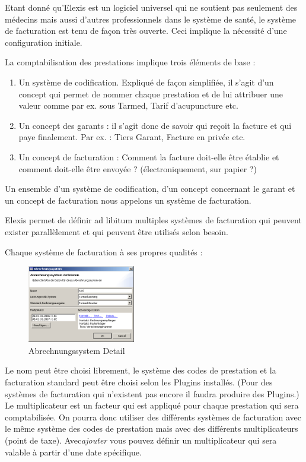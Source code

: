 Etant donné qu'Elexis est un logiciel universel qui ne soutient pas seulement des médecins mais aussi d'autres professionnels dans le système de santé, le système de facturation est tenu de façon très ouverte. Ceci implique la nécessité d'une configuration initiale.

La comptabilisation des prestations implique trois éléments de base :
\begin{enumerate}
    \item Un système de codification. Expliqué de façon simplifiée, il s'agit d'un concept qui permet de nommer chaque prestation et de lui attribuer une valeur comme par ex. sous \glqq Tarmed\grqq{}, \glqq Tarif d'acupuncture \grqq{} etc.
   \item Un concept des garants : il s'agit donc de savoir qui reçoit la facture et qui paye finalement.  Par ex. : Tiers Garant, Facture en privée etc.
   \item Un concept de facturation : Comment la facture doit-elle être établie et comment doit-elle être envoyée ? (électroniquement, sur papier ?)
\end{enumerate}

Un ensemble d'un système de codification, d'un concept concernant le garant et un concept de facturation nous appelons un  \glqq système de facturation\grqq{}.

Elexis permet de définir ad libitum multiples systèmes de facturation qui peuvent exister parallèlement et qui peuvent être utilisés selon besoin. 

Chaque système de facturation à ses propres qualités :\\
\begin{figure}
    \includegraphics[width=4.7cm]{images/abrechnungssystem1}
    \caption{Abrechnungssystem Detail}
    \label{fig:abr1}
\end{figure}

Le nom peut être choisi librement, le système des codes de prestation et la facturation standard peut être choisi selon les Plugins installés. (Pour des systèmes de facturation qui n'existent pas encore il faudra produire des Plugins.) Le multiplicateur est un facteur qui est appliqué pour chaque prestation qui sera comptabilisée. On pourra donc utiliser des différents systèmes de facturation avec le même système des codes de prestation mais avec des différents multiplicateurs  (\glqq point de taxe\grqq{}). Avec\textit{ajouter} vous pouvez définir un multiplicateur qui sera valable à partir d'une date spécifique.

